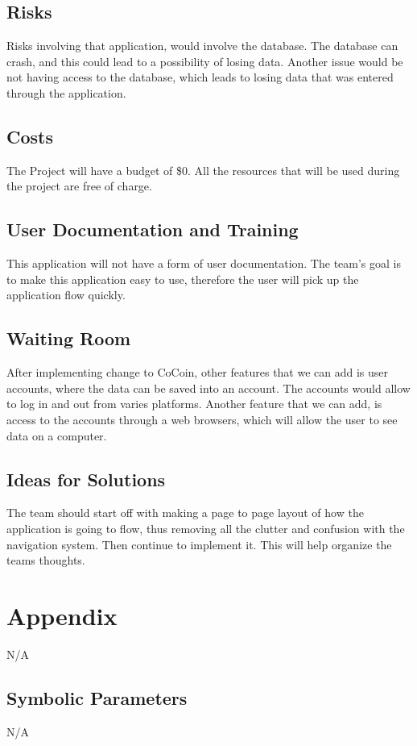 \documentclass[12pt, titlepage]{article}
\begin{document}
\subsection{Risks}
Risks involving that application, would involve the database. The database can crash, and this could lead to a possibility of losing data. Another issue would be not having access to the database, which leads to losing data that was entered through the application.
\subsection{Costs}
The Project will have a budget of \$0. All the resources that will be used during the project are free of charge. 
\subsection{User Documentation and Training}
This application will not have a form of user documentation. The team’s goal is to make this application easy to use, therefore the user will pick up the application flow quickly. 
\subsection{Waiting Room}
After implementing change to CoCoin, other features that we can add is user accounts, where the data can be saved into an account. The accounts would allow to log in and out from varies platforms. Another feature that we can add, is access to the accounts through a web browsers, which will allow the user to see data on a computer. 
\subsection{Ideas for Solutions}
The team should start off with making a page to page layout of how the application is going to flow, thus removing all the clutter and confusion with the navigation system. Then continue to implement it. This will help organize the teams thoughts.




\newpage

\section{Appendix}
N/A

\subsection{Symbolic Parameters}
N/A
\end{document}
